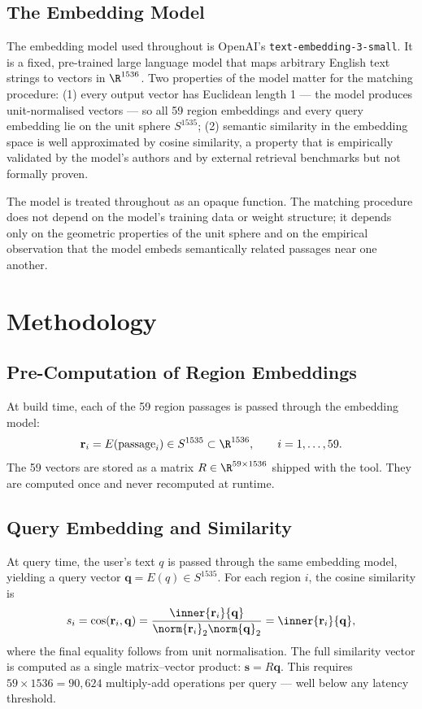 \documentclass[11pt]{article}
\begin{document}
\subsection{The Embedding Model}
The embedding model used throughout is OpenAI's \texttt{text-embedding-3-small}. It is a fixed, pre-trained large language model that maps arbitrary English text strings to vectors in $\R^{1536}$. Two properties of the model matter for the matching procedure: (1) every output vector has Euclidean length 1 --- the model produces unit-normalised vectors --- so all 59 region embeddings and every query embedding lie on the unit sphere $S^{1535}$; (2) semantic similarity in the embedding space is well approximated by cosine similarity, a property that is empirically validated by the model's authors and by external retrieval benchmarks but not formally proven.

The model is treated throughout as an opaque function. The matching procedure does not depend on the model's training data or weight structure; it depends only on the geometric properties of the unit sphere and on the empirical observation that the model embeds semantically related passages near one another.

\section{Methodology}

\subsection{Pre-Computation of Region Embeddings}
At build time, each of the 59 region passages is passed through the embedding model:
\[
\mathbf{r}_i = E(\text{passage}_i) \in S^{1535} \subset \R^{1536}, \qquad i = 1, \ldots, 59.
\]
The 59 vectors are stored as a matrix $R \in \R^{59 \times 1536}$ shipped with the tool. They are computed once and never recomputed at runtime.

\subsection{Query Embedding and Similarity}
At query time, the user's text $q$ is passed through the same embedding model, yielding a query vector $\mathbf{q} = E(q) \in S^{1535}$. For each region $i$, the cosine similarity is
\[
s_i = \cos(\mathbf{r}_i, \mathbf{q}) = \frac{\inner{\mathbf{r}_i}{\mathbf{q}}}{\norm{\mathbf{r}_i}_2 \norm{\mathbf{q}}_2} = \inner{\mathbf{r}_i}{\mathbf{q}},
\]
where the final equality follows from unit normalisation. The full similarity vector is computed as a single matrix--vector product: $\mathbf{s} = R \mathbf{q}$. This requires $59 \times 1536 = 90{,}624$ multiply-add operations per query --- well below any latency threshold.
\end{document}
